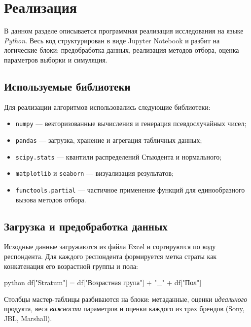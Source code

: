 \section{Реализация}

В данном разделе описывается программная реализация исследования на языке \textit{Python}.
Весь код структурирован в виде Jupyter Notebook и разбит на логические блоки:
предобработка данных, реализация методов отбора, оценка параметров выборки и симуляция.

\subsection{Используемые библиотеки}

Для реализации алгоритмов использовались следующие библиотеки:

\begin{itemize}[noitemsep]
    \item \texttt{numpy} --- векторизованные вычисления и генерация псевдослучайных чисел;
    \item \texttt{pandas} --- загрузка, хранение и агрегация табличных данных;
    \item \texttt{scipy.stats} --- квантили распределений Стьюдента и нормального;
    \item \texttt{matplotlib} и \texttt{seaborn} --- визуализация результатов;
    \item \texttt{functools.partial} --- частичное применение функций для единообразного вызова методов отбора.
\end{itemize}

\subsection{Загрузка и предобработка данных}

Исходные данные загружаются из файла Excel и сортируются по коду респондента.
Для каждого респондента формируется метка страты как конкатенация его возрастной 
группы и пола:

\begin{mintedbox}{python}
df["Stratum"] = df["Возрастная група"] + "_" + df["Пол"]
\end{mintedbox}

Столбцы мастер-таблицы разбиваются на блоки: метаданные, оценки \textit{идеального}
 продукта, веса \textit{важности} параметров и оценки каждого из трeх брендов (Sony, JBL, Marshall).

